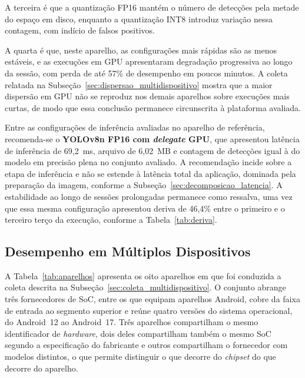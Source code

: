 \documentclass[artigo,times,capa]{iftex2024}
\begin{document}
A terceira é que a quantização \ac{FP16} mantém o número de detecções pela metade do espaço em disco, enquanto a quantização \ac{INT8} introduz variação nessa contagem, com indício de falsos positivos.

A quarta é que, neste aparelho, as configurações mais rápidas são as menos estáveis, e as execuções em \ac{GPU} apresentaram degradação progressiva ao longo da sessão, com perda de até 57\% de desempenho em poucos minutos. A coleta relatada na Subseção~\ref{sec:dispersao_multidispositivo} mostra que a maior dispersão em \ac{GPU} não se reproduz nos demais aparelhos sobre execuções mais curtas, de modo que essa conclusão permanece circunscrita à plataforma avaliada.

Entre as configurações de inferência avaliadas no aparelho de referência, recomenda-se o \textbf{YOLOv8n \ac{FP16} com \textit{delegate} \ac{GPU}}, que apresentou latência de inferência de 69,2~ms, arquivo de 6,02~MB e contagem de detecções igual à do modelo em precisão plena no conjunto avaliado. A recomendação incide sobre a etapa de inferência e não se estende à latência total da aplicação, dominada pela preparação da imagem, conforme a Subseção~\ref{sec:decomposicao_latencia}. A estabilidade ao longo de sessões
prolongadas permanece como ressalva, uma vez que essa mesma configuração
apresentou deriva de 46,4\% entre o primeiro e o terceiro terço da execução,
conforme a Tabela~\ref{tab:deriva}.

\FloatBarrier

\subsection{Desempenho em Múltiplos Dispositivos}
\label{sec:multidispositivo}

A Tabela~\ref{tab:aparelhos} apresenta os oito aparelhos em que foi
conduzida a coleta descrita na Subseção~\ref{sec:coleta_multidispositivo}. O conjunto
abrange três fornecedores de \ac{SoC}, entre os que equipam aparelhos
Android, cobre
da faixa de entrada ao segmento superior e reúne quatro versões do sistema
operacional, do Android~12 ao Android~17. Três aparelhos
compartilham o mesmo identificador de \textit{hardware}, dois deles
compartilham também o mesmo \ac{SoC} segundo a especificação do fabricante e
outros compartilham o fornecedor com modelos distintos, o que permite
distinguir o que decorre do \textit{chipset} do que decorre do aparelho.


\end{document}
